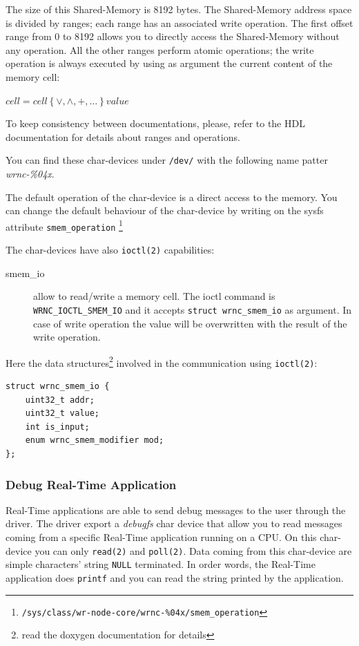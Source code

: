 \documentclass[a4paper,10pt]{article}
\begin{document}
The size of this Shared-Memory is 8192 bytes. The Shared-Memory
address space is divided by ranges; each range has an associated write
operation. The first offset range from 0 to 8192 allows you to
directly access the Shared-Memory without any operation. All the other
ranges perform atomic operations; the write operation is always
executed by using as argument the current content of the memory cell:

\begin{math}
  cell = cell \left\{ \vee, \wedge, +, \dots \right\} value
\end{math}

To keep consistency between documentations, please, refer to the HDL 
documentation for details about ranges and operations.

You can find these char-devices under \texttt{/dev/} with the
following name patter \textit{wrnc-\%04x}.

The default operation of the char-device is a direct access to the 
memory. You can change the default behaviour of the char-device by 
writing on the sysfs attribute \texttt{smem\_operation}
\footnote{\texttt{/sys/class/wr-node-core/wrnc-\%04x/smem\_operation}}
 

The char-devices have also \texttt{ioctl(2)} capabilities:
\begin{description}
  \item[smem\_io] allow to read/write a memory cell. The ioctl command
    is \texttt{WRNC\_IOCTL\_SMEM\_IO} and it accepts \texttt{struct
    wrnc\_smem\_io} as argument. In case of write operation the
    value will be overwritten with the result of the write operation.
\end{description}

Here the data structures\footnote{read the doxygen documentation for 
details} involved in the communication using
\texttt{ioctl(2)}:

\begin{lstlisting}
struct wrnc_smem_io {
	uint32_t addr;
	uint32_t value;
	int is_input;
	enum wrnc_smem_modifier mod;
};
\end{lstlisting}

\subsubsection{Debug Real-Time Application}%
Real-Time applications are able to send debug messages to the user
through the driver. The driver export a \textit{debugfs} char device
that allow you to read messages coming from a specific Real-Time
application running on a CPU. On this char-device you can only
\texttt{read(2)} and \texttt{poll(2)}. Data coming from this char-device
are simple characters' string \texttt{NULL} terminated. In order words,
the Real-Time application does \texttt{printf} and you can read the
string printed by the application.
\end{document}
